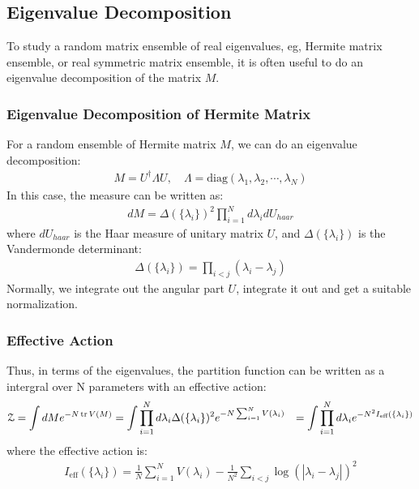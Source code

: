 \subsection{Eigenvalue Decomposition}

To study a random matrix ensemble of real eigenvalues, eg, Hermite matrix ensemble, or real symmetric matrix ensemble, it is often useful to do an eigenvalue decomposition of the matrix $ M $. 

\subsubsection{Eigenvalue Decomposition of Hermite Matrix}

For a random ensemble of Hermite matrix $ M $, we can do an eigenvalue decomposition:
\begin{align}
  M = U^\dagger \Lambda U, \quad \Lambda = \text{diag}(\lambda_1, \lambda_2, \cdots, \lambda_N)
\end{align}
In this case, the measure can be written as:
\begin{align}
  dM = \Delta(\{\lambda_i\})^2  \prod_{i=1}^N d\lambda_i dU_{haar}
\end{align}
where $ dU_{haar} $ is the Haar measure of unitary matrix $ U $, and $ \Delta(\{\lambda_i\}) $ is the Vandermonde determinant:
\begin{align}
  \Delta(\{\lambda_i\}) = \prod_{i<j} (\lambda_i - \lambda_j)
\end{align}
Normally, we integrate out the angular part $ U $, integrate it out and get a suitable normalization.

\subsubsection{Effective Action}

Thus, in terms of the eigenvalues, the partition function can be written as a intergral over N parameters with an effective action:
\begin{align}
  \mathcal{Z} &= \int dM e^{-N \tr V(M)} = \int \prod_{i=1}^N d\lambda_i \Delta(\{\lambda_i\})^2 e^{-N \sum_{i=1}^N V(\lambda_i)} 
  &= \int \prod_{i=1}^N d\lambda_i e^{- N^2 I_{\text{eff}}(\{\lambda_i\})}
\end{align}
where the effective action is:
\begin{align}
  I_{\text{eff}}(\{\lambda_i\}) = \displaystyle\frac{1}{N} \sum_{i=1}^N V(\lambda_i) - \displaystyle\frac{1}{N^2} \sum_{i<j} \log(|\lambda_i - \lambda_j|)^2
\end{align}


